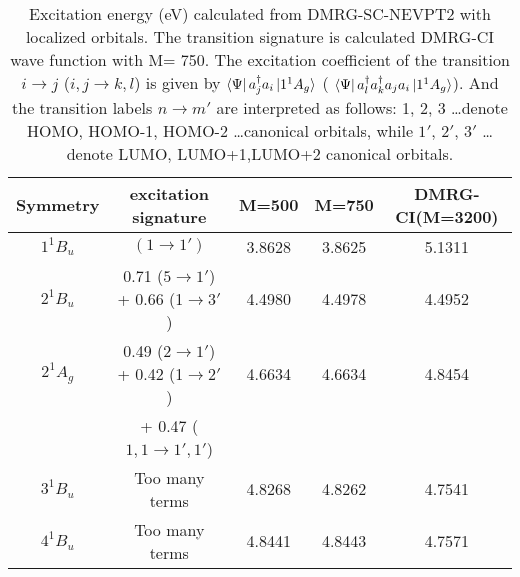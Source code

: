 \begin{table*}
  \centering
  \caption{Excitation energy (eV) calculated from DMRG-SC-NEVPT2 with localized orbitals. The transition signature is calculated DMRG-CI wave function with M= 750. The excitation coefficient of the transition $i\rightarrow j$ ($i,j \rightarrow k,l$) is given by $\bra{\Psi}a^\dagger_j a_i\ket{1^1A_g}$ ( $\bra{\Psi}a^\dagger_l a^\dagger_k a_j a_i\ket{1^1A_g}$).
And the transition labels $n\rightarrow m'$ are interpreted as follows: 1, 2, 3 \ldots denote HOMO, HOMO-1, HOMO-2 \ldots canonical orbitals, while $1'$, $2'$, $3'$ \ldots denote LUMO, LUMO+1,LUMO+2 canonical orbitals.}
  \label{table:local}
\begin{tabular}{ccccc}
\hline
Symmetry & excitation signature &  M=500 & M=750 & DMRG-CI(M=3200) \\

\hline
$1^1B_u$ & $(1\rightarrow1')$ & 3.8628   &   3.8625   & 5.1311 \\
  $2^1B_u$ & 0.71 ($5\rightarrow 1'$) + 0.66 (1$\rightarrow 3'$) & 4.4980   &   4.4978   & 4.4952    \\
  $2^1A_g$ & 0.49 ($2\rightarrow 1'$) + 0.42 (1$\rightarrow 2'$) & 4.6634   &   4.6634   & 4.8454    \\
  &   + 0.47 ($1,1\rightarrow1',1'$)  & & &\\
  $3^1B_u$ & Too many terms & 4.8268   &   4.8262   & 4.7541    \\
  $4^1B_u$ & Too many terms & 4.8441   &   4.8443   & 4.7571    \\
\hline
\end{tabular}
\end{table*}
